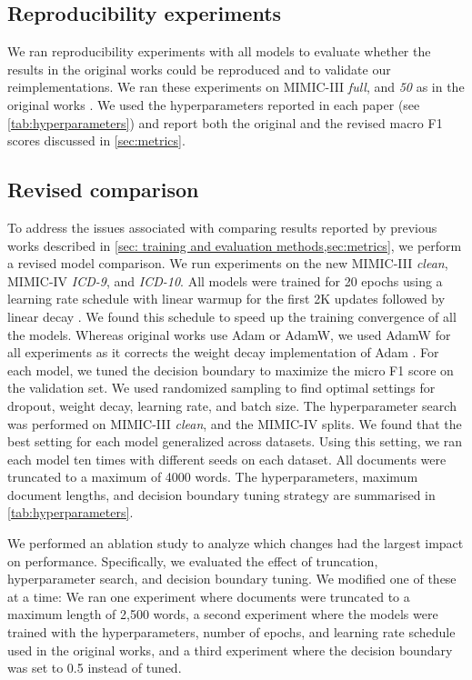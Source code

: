 {\subsection{Reproducibility experiments}

We ran reproducibility experiments with all models to evaluate whether the results in the original works could be reproduced and to validate our reimplementations. We ran these experiments on MIMIC-III \textit{full}, and \textit{50} as in the original works \cite{mullenbachExplainablePredictionMedical2018,liICDCodingClinical2020,vuLabelAttentionModel2020,huangPLMICDAutomaticICD2022}. We used the hyperparameters reported in each paper (see \cref{tab:hyperparameters}) and report both the original and the revised macro F1 scores discussed in \cref{sec:metrics}.

\subsection{Revised comparison}
To address the issues associated with comparing results reported by previous works described in \cref{sec: training and evaluation methods,sec:metrics}, we perform a revised model comparison. We run experiments on the new MIMIC-III \textit{clean}, MIMIC-IV \textit{ICD-9}, and \textit{ICD-10}.
All models were trained for 20 epochs using a learning rate schedule with linear warmup for the first 2K updates followed by linear decay \cite{huangPLMICDAutomaticICD2022}. We found this schedule to speed up the training convergence of all the models.
Whereas original works use Adam or AdamW, we used AdamW for all experiments as it corrects the weight decay implementation of Adam \cite{kingmaAdamMethodStochastic2017, loshchilovDecoupledWeightDecay2022}. For each model, we tuned the decision boundary to maximize the micro F1 score on the validation set. We used randomized sampling to find optimal settings for dropout, weight decay, learning rate, and batch size. The hyperparameter search was performed on MIMIC-III \textit{clean}, and the MIMIC-IV splits. We found that the best setting for each model generalized across datasets. Using this setting, we ran each model ten times with different seeds on each dataset. All documents were truncated to a maximum of 4000 words. The hyperparameters, maximum document lengths, and decision boundary tuning strategy are summarised in \cref{tab:hyperparameters}. 

We performed an ablation study to analyze which changes had the largest impact on performance. 
Specifically, we evaluated the effect of truncation, hyperparameter search, and decision boundary tuning. We modified one of these at a time: We ran one experiment where documents were truncated to a maximum length of 2,500 words, a second experiment where the models were trained with the hyperparameters, number of epochs, and learning rate schedule used in the original works, and a third experiment where the decision boundary was set to 0.5 instead of tuned.

}
